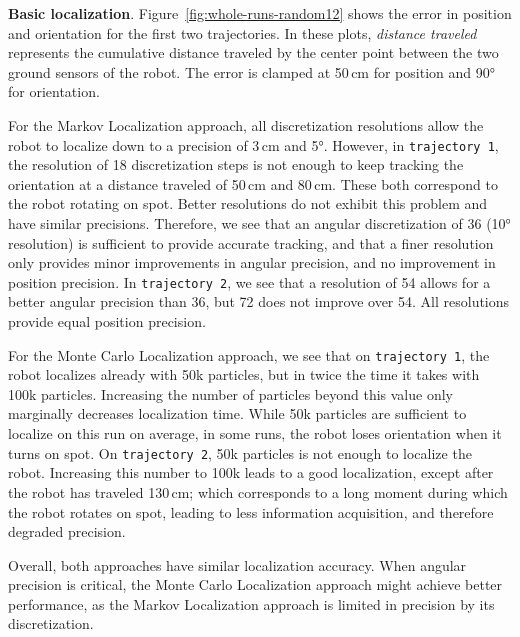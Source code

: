 \documentclass{svmult}
\newcommand{\Fig}[1]{Figure~\ref{fig:#1}}
\begin{document}
\textbf{Basic localization}.
\Fig{whole-runs-random12} shows the error in position and orientation for the first two trajectories.
In these plots, \emph{distance traveled} represents the cumulative distance traveled by the center point between the two ground sensors of the robot.
The error is clamped at 50\,cm for position and 90° for orientation.

For the Markov Localization approach, all discretization resolutions allow the robot to localize down to a precision of 3\,cm and 5°.
However, in \texttt{trajectory~1}, the resolution of 18 discretization steps is not enough to keep tracking the orientation at a distance traveled of 50\,cm and 80\,cm.
These both correspond to the robot rotating on spot.
Better resolutions do not exhibit this problem and have similar precisions.
Therefore, we see that an angular discretization of 36 (10° resolution) is sufficient to provide accurate tracking, and that a finer resolution only provides minor improvements in angular precision, and no improvement in position precision.
In \texttt{trajectory~2}, we see that a resolution of 54 allows for a better angular precision than 36, but 72 does not improve over 54.
All resolutions provide equal position precision.

For the Monte Carlo Localization approach, we see that on \texttt{trajectory~1}, the robot localizes already with 50k particles, but in twice the time it takes with 100k particles.
Increasing the number of particles beyond this value only marginally decreases localization time.
While 50k particles are sufficient to localize on this run on average, in some runs, the robot loses orientation when it turns on spot.
On \texttt{trajectory~2}, 50k particles is not enough to localize the robot.
Increasing this number to 100k leads to a good localization, except after the robot has traveled 130\,cm; which corresponds to a long moment during which the robot rotates on spot, leading to less information acquisition, and therefore degraded precision.

Overall, both approaches have similar localization accuracy.
When angular precision is critical, the Monte Carlo Localization approach might achieve better performance, as the Markov Localization approach is limited in precision by its discretization.

\end{document}
